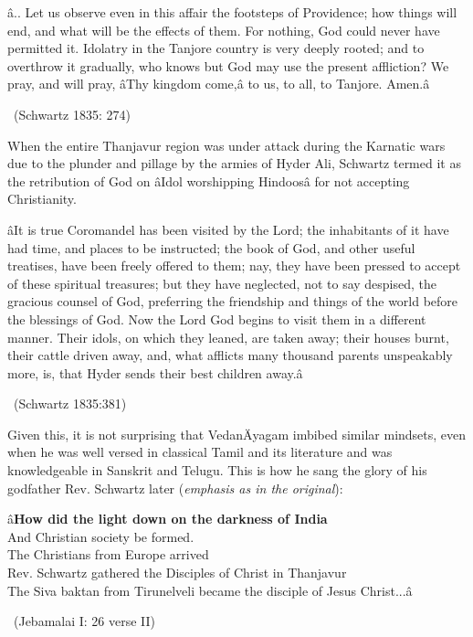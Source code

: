 \begin{myquote}
â.. Let us observe even in this affair the footsteps of Providence; how things will end, and what will be the effects of them. For nothing, God could never have permitted it. Idolatry in the Tanjore country is very deeply rooted; and to overthrow it gradually, who knows but God may use the present affliction? We pray, and will pray, âThy kingdom come,â to us, to all, to Tanjore. Amen.â 

~\hfill (Schwartz 1835: 274)
\end{myquote}

When the entire Thanjavur region was under attack during the Karnatic wars due to the plunder and pillage by the armies of Hyder Ali, Schwartz termed it as the retribution of God on âIdol worshipping Hindoosâ for not accepting Christianity.

\begin{myquote}
âIt is true Coromandel has been visited by the Lord; the inhabitants of it have had time, and places to be instructed; the book of God, and other useful treatises, have been freely offered to them; nay, they have been pressed to accept of these spiritual treasures; but they have neglected, not to say despised, the gracious counsel of God, preferring the friendship and things of the world before the blessings of God. Now the Lord God begins to visit them in a different manner. Their idols, on which they leaned, are taken away; their houses burnt, their cattle driven away, and, what afflicts many thousand parents unspeakably more, is, that Hyder sends their best children away.â 

~\hfill (Schwartz 1835:381)
\end{myquote}

\newpage

Given this, it is not surprising that VedanÄyagam imbibed similar mindsets, even when he was well versed in classical Tamil and its literature and was knowledgeable in Sanskrit and Telugu. This is how he sang the glory of his godfather Rev. Schwartz later (\textit{emphasis as in the original}):

\begin{myquote}
â\textbf{How did the light down on the darkness of India}\\ And Christian society be formed.\\ The Christians from Europe arrived\\ Rev. Schwartz gathered the Disciples of Christ in Thanjavur\\ The Siva baktan from Tirunelveli became the disciple of Jesus Christ...â 

~\hfill (Jebamalai I: 26 verse II)
\end{myquote}

